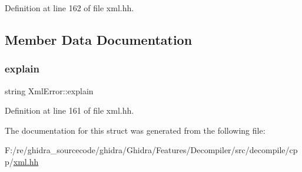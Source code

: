 Definition at line 162 of file xml.\+hh.



\subsection{Member Data Documentation}
\mbox{\label{struct_xml_error_aa151d34ce48f4ac6ee225f2491758f9a}} 
\subsubsection{\texorpdfstring{explain}{explain}}
{\footnotesize\ttfamily string Xml\+Error\+::explain}



Definition at line 161 of file xml.\+hh.



The documentation for this struct was generated from the following file\+:\begin{DoxyCompactItemize}
\item 
F\+:/re/ghidra\+\_\+sourcecode/ghidra/\+Ghidra/\+Features/\+Decompiler/src/decompile/cpp/\mbox{\hyperlink{xml_8hh}{xml.\+hh}}\end{DoxyCompactItemize}
